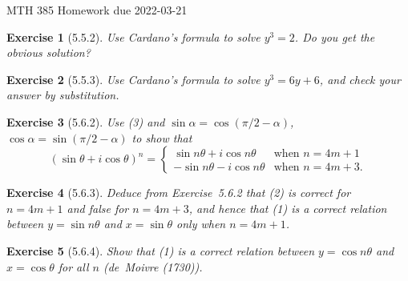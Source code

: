 \documentclass[12pt]{article}
\theoremstyle{plain}
\newtheorem{ex}{Exercise}
\begin{document}
MTH 385 \qquad Homework due 2022-03-21

\begin{ex} [5.5.2]
  Use Cardano's formula to solve $y^3=2$. Do you get the obvious solution?
\end{ex}

\begin{ex} [5.5.3]
  Use Cardano's formula to solve $y^3=6y+6$, and check your answer by substitution.
\end{ex}

\begin{ex} [5.6.2]
  Use (3) and $\sin\alpha=\cos(\pi/2-\alpha)$, $\cos\alpha=\sin(\pi/2-\alpha)$ to show that
  \[
    (\sin\theta+i\cos\theta)^n=\left\{\begin{array}{rl}
       \sin n\theta+i\cos n\theta & \mbox{when $n=4m+1$} \\
      -\sin n\theta-i\cos n\theta & \mbox{when $n=4m+3$.}
    \end{array} \right.
  \]
\end{ex}

\begin{ex} [5.6.3]
  Deduce from Exercise~5.6.2 that (2) is correct for $n=4m+1$ and false for $n=4m+3$, and hence that (1) is a correct relation between $y=\sin n\theta$ and $x=\sin\theta$ only when $n=4m+1$.
\end{ex}

\begin{ex} [5.6.4]
  Show that (1) is a correct relation between $y=\cos n\theta$ and $x=\cos\theta$ for all $n$ (de~Moivre (1730)).
\end{ex}
\end{document}
